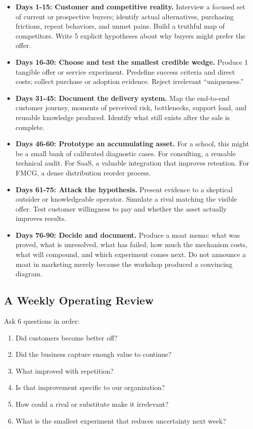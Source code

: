\begin{itemize}
    \item \textbf{Days 1-15: Customer and competitive reality.} Interview a focused set of current or prospective buyers; identify actual alternatives, purchasing frictions, repeat behaviors, and unmet pains. Build a truthful map of competitors. Write 5 explicit hypotheses about why buyers might prefer the offer.
    \item \textbf{Days 16-30: Choose and test the smallest credible wedge.} Produce 1 tangible offer or service experiment. Predefine success criteria and direct costs; collect purchase or adoption evidence. Reject irrelevant ``uniqueness.''
    \item \textbf{Days 31-45: Document the delivery system.} Map the end-to-end customer journey, moments of perceived risk, bottlenecks, support load, and reusable knowledge produced. Identify what still exists after the sale is complete.
    \item \textbf{Days 46-60: Prototype an accumulating asset.} For a school, this might be a small bank of calibrated diagnostic cases. For consulting, a reusable technical audit. For SaaS, a valuable integration that improves retention. For FMCG, a dense distribution reorder process.
    \item \textbf{Days 61-75: Attack the hypothesis.} Present evidence to a skeptical outsider or knowledgeable operator. Simulate a rival matching the visible offer. Test customer willingness to pay and whether the asset actually improves results.
    \item \textbf{Days 76-90: Decide and document.} Produce a moat memo: what was proved, what is unresolved, what has failed, how much the mechanism costs, what will compound, and which experiment comes next. Do not announce a moat in marketing merely because the workshop produced a convincing diagram.
\end{itemize}

\subsection{A Weekly Operating Review}
\label{sec:weekly_operating_review}

Ask 6 questions in order:
\begin{enumerate}
    \item Did customers become better off?
    \item Did the business capture enough value to continue?
    \item What improved with repetition?
    \item Is that improvement specific to our organization?
    \item How could a rival or substitute make it irrelevant?
    \item What is the smallest experiment that reduces uncertainty next week?
\end{enumerate}

